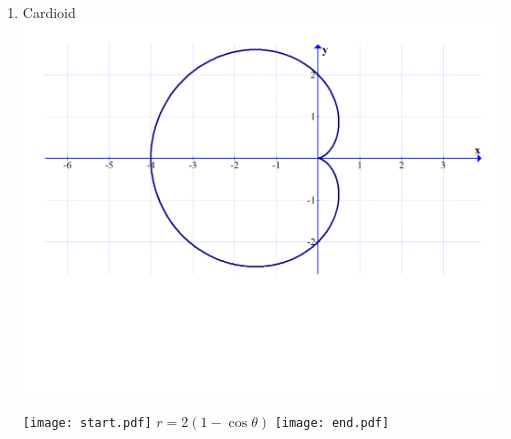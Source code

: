 \documentclass[12pt]{article}
\begin{document}
\begin{enumerate}
\item Cardioid\\
\includegraphics[scale=0.35]{graph3.pdf}

\texttt{[image: start.pdf]}
{{$r=2(1-\cos{\theta})$}}
\texttt{[image: end.pdf]}


\end{enumerate}

\end{document}
